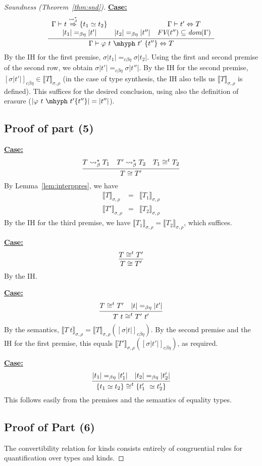 \documentclass{article}
\newcommand{\interp}[1]{\llbracket #1 \rrbracket}
\newcommand{\tpsynthleads}[0]{\ensuremath{\overset{\leadsto_\beta^*}{\Rightarrow}}}
\newcommand{\cbe}[0]{c\beta\eta}
\newcommand{\startcase}[1]{\vspace{#1} \noindent\textbf{\underline{Case:}}}
\begin{document}
\begin{proof}[Soundness (Theorem~\ref{thm:snd})]
\startcase{.2cm}
\[
  \infer{\Gamma\vdash \varphi\ t\ \mhyph\ t'\ \{t''\} \Leftrightarrow T}
  {
    \begin{array}{ccc}
      \Gamma\vdash t\tpsynthleads \{t_1\simeq t_2\}
      &
      & \Gamma\vdash t' \Leftrightarrow T
      \\ |t_1| =_{\beta\eta} |t'|
      & |t_2| =_{\beta\eta} |t''|
      & \textit{FV}(t'') \subseteq \textit{dom}(\Gamma)
    \end{array}
  }
\]
By the IH for the first premise, $\sigma|t_1| =_{\cbe} \sigma|t_2|$.
Using the first and second premise of the second row, we obtain \(\sigma|t'|
=_{\cbe} \sigma|t''|\).
By the IH for the second premise,
$[\sigma|t'|]_{\cbe}\in\interp{T}_{\sigma,\rho}$ (in the case of type synthesis,
the IH also tells us \(\interp{T}_{\sigma,\rho}\) is defined).
This suffices for the desired conclusion, using also the definition of erasure
($|\varphi\ t\ \mhyph\ t'\{t''\}| = |t''|$).

\subsection*{Proof of part (5) }



\startcase{.2cm}
\[
    \infer{T \cong T'}{T \leadsto^*_\beta T_1 & T' \leadsto^*_\beta T_2 & T_1\cong^t T_2}  
\]
By Lemma~\ref{lem:interppres}, we have
\[
\begin{array}{lll}
  \interp{T}_{\sigma,\rho} & = & \interp{T_1}_{\sigma,\rho}\\
  \interp{T'}_{\sigma,\rho} & = & \interp{T_2}_{\sigma,\rho}
\end{array}
\]
By the IH for the third premise, we have $\interp{T_1}_{\sigma,\rho} = \interp{T_2}_{\sigma,\rho}$,
which suffices.

\startcase{.2cm}
\[
    \infer{T \cong T'}{T \cong^t T'} 
\]
By the IH.

\startcase{.2cm}
\[
    \infer{T\ t \cong^t T'\ t'}{T \cong^t T' & |t| =_{\beta\eta} |t'|}
\]
By the semantics, $\interp{T\ t}_{\sigma,\rho} =
\interp{T}_{\sigma,\rho}([\sigma|t|]_{\cbe})$.  By the second premise
and the IH for the first premise, this equals
$\interp{T'}_{\sigma,\rho}([\sigma|t'|]_{\cbe})$, as required.

\startcase{.2cm}
\[
    \infer{\{ t_1 \simeq t_2 \} \cong^t \{ t_1'\ \simeq t_2' \}}{|t_1| =_{\beta\eta} |t_1'| & |t_2| =_{\beta\eta} |t_2'|}
\]
This follows easily from the premises and the semantics of equality types.

\subsection*{Proof of Part (6)}

The convertibility relation for kinds consists entirely of congruential rules
for quantification over types and kinds.

\end{proof}
\end{document}
